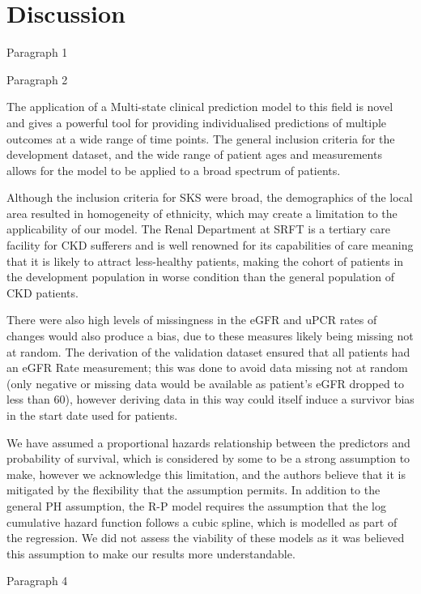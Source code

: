 \documentclass[12pt,twoside]{reedthesis}
\begin{document}
\hypertarget{discussion-2}{%
\section{Discussion}\label{discussion-2}}

Paragraph 1

Paragraph 2

The application of a Multi-state clinical prediction model to this field is novel and gives a powerful tool for providing individualised predictions of multiple outcomes at a wide range of time points. The general inclusion criteria for the development dataset, and the wide range of patient ages and measurements allows for the model to be applied to a broad spectrum of patients.

Although the inclusion criteria for SKS were broad, the demographics of the local area resulted in homogeneity of ethnicity, which may create a limitation to the applicability of our model. The Renal Department at SRFT is a tertiary care facility for CKD sufferers and is well renowned for its capabilities of care meaning that it is likely to attract less-healthy patients, making the cohort of patients in the development population in worse condition than the general population of CKD patients.

There were also high levels of missingness in the eGFR and uPCR rates of changes would also produce a bias, due to these measures likely being missing not at random. The derivation of the validation dataset ensured that all patients had an eGFR Rate measurement; this was done to avoid data missing not at random (only negative or missing data would be available as patient's eGFR dropped to less than 60), however deriving data in this way could itself induce a survivor bias in the start date used for patients.

We have assumed a proportional hazards relationship between the predictors and probability of survival, which is considered by some to be a strong assumption to make, however we acknowledge this limitation, and the authors believe that it is mitigated by the flexibility that the assumption permits. In addition to the general PH assumption, the R-P model requires the assumption that the log cumulative hazard function follows a cubic spline, which is modelled as part of the regression. We did not assess the viability of these models as it was believed this assumption to make our results more understandable.

Paragraph 4
\end{document}
